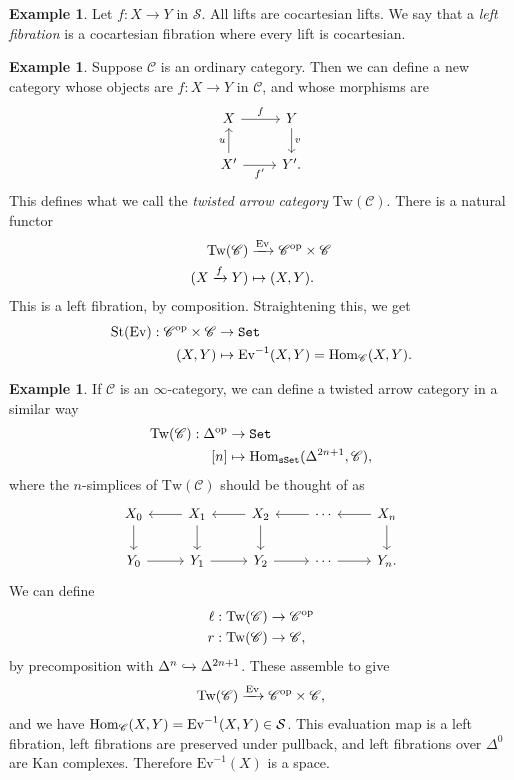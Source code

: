 \documentclass[12pt]{amsart}
\theoremstyle{definition}
\newtheorem{example}[theorem]{Example}
\providecommand{\St}{\text{St}}
\providecommand{\Tw}{\text{Tw}}
\providecommand{\Ev}{\text{Ev}}
\begin{document}
\begin{example} Let $f: X \to Y$ in $\mathcal{S}$. All lifts are cocartesian lifts. We say that a \textit{left fibration} is a cocartesian fibration where every lift is cocartesian.
\end{example}

\begin{example} Suppose $\mathscr{C}$ is an ordinary category. Then we can define a new category whose objects are $f: X \to Y$ in $\mathscr{C}$, and whose morphisms are
\[ \begin{tikzcd}
    X\rar["f"] & Y\dar["v"]\\
    X'\uar["u" left]\rar["f'" below] & Y'.
\end{tikzcd} \]
This defines what we call the \textit{twisted arrow category} $\Tw(\mathscr{C})$. There is a natural functor
\begin{align*}
    \Tw(\mathscr{C}) &\xto{\Ev} \mathscr{C}^\op \times \mathscr{C} \\
    (X \xto{f} Y) &\mapsto (X,Y).
\end{align*}
This is a left fibration, by composition. Straightening this, we get
\begin{align*}
    \St(\Ev): \mathscr{C}^\op \times \mathscr{C} &\to \Set \\
    (X,Y) &\mapsto \Ev^{-1}(X,Y) = \Hom_\mathscr{C}(X,Y).
\end{align*}
\end{example}

\begin{example} If $\mathscr{C}$ is an $\infty$-category, we can define a twisted arrow category in a similar way
\begin{align*}
    \Tw(\mathscr{C}): \Delta^\op &\to \Set \\
    [n] &\mapsto \Hom_{\sSet}(\Delta^{2n+1},\mathscr{C}),
\end{align*}
where the $n$-simplices of $\Tw(\mathscr{C})$ should be thought of as
\[ \begin{tikzcd}
    X_0\dar & X_1\dar\lar & X_2\dar\lar & \cdots\lar & X_n\dar\lar\\
    Y_0\rar & Y_1\rar & Y_2\rar & \cdots\rar & Y_n.
\end{tikzcd} \]
We can define
\begin{align*}
    \ell: \Tw(\mathscr{C}) &\to \mathscr{C}^\op \\
    r: \Tw(\mathscr{C}) &\to \mathscr{C},
\end{align*}
by precomposition with $\Delta^n \xhookrightarrow{} \Delta^{2n+1}$. These assemble to give
\begin{align*}
    \Tw(\mathscr{C}) \xto{\Ev} \mathscr{C}^\op \times \mathscr{C},
\end{align*}
and we have $\Hom_\mathscr{C}(X,Y) = \Ev^{-1}(X,Y) \in \mathcal{S}$. This evaluation map is a left fibration, left fibrations are preserved under pullback, and left fibrations over $\Delta^0$ are Kan complexes. Therefore $\Ev^{-1}(X)$ is a space.
\end{example}
\end{document}
